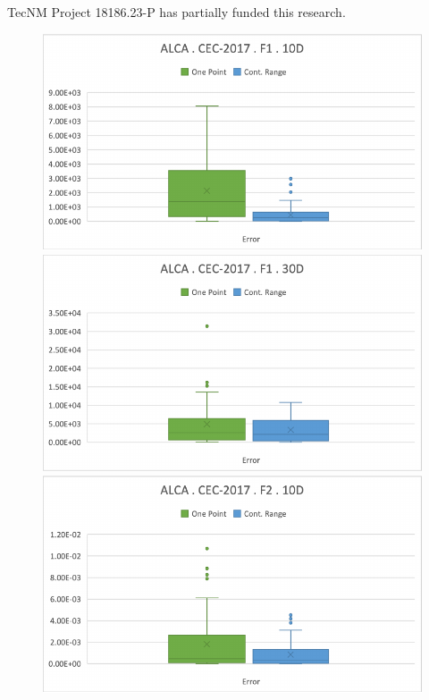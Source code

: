 \documentclass[graybox]{svmult}
\begin{document}
\begin{acknowledgement}
    TecNM Project 18186.23-P has partially funded this research.
\end{acknowledgement}

    
    \begin{figure}[!ht]
        \begin{minipage}[h]{0.49\linewidth}
            \includegraphics[width=1\linewidth]{img/fig_experiment_F1x10D.pdf} 
        \end{minipage}
        \hfill
        \begin{minipage}[h]{0.49\linewidth}
            \includegraphics[width=1\linewidth]{img/fig_experiment_F1x30D.pdf} 
        \end{minipage}
        \vfill
        \vspace{0.05 cm}
        \begin{minipage}[h]{0.49\linewidth}
            \includegraphics[width=1\linewidth]{img/fig_experiment_F2x10D.pdf} 

\end{minipage}
\end{figure}
\end{document}
